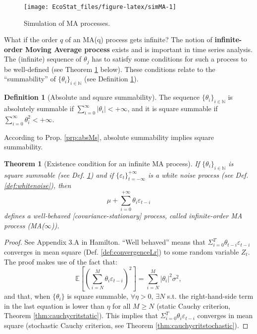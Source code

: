 \documentclass[
  12pt,
]{book}
\newtheorem{theorem}{Theorem}[chapter]
\theoremstyle{definition}
\newtheorem{definition}{Definition}[chapter]
\theoremstyle{definition}
\theoremstyle{definition}
\theoremstyle{definition}
\theoremstyle{remark}
\begin{document}
\begin{figure}
\texttt{[image: EcoStat\_files/figure-latex/simMA-1]} \caption{Simulation of MA processes.}\label{fig:simMA}
\end{figure}

What if the order \(q\) of an MA(q) process gets infinite? The notion of \textbf{infinite-order Moving Average process} exists and is important in time series analysis. The (infinite) sequence of \(\theta_j\) has to satisfy some conditions for such a process to be well-defined (see Theorem \ref{thm:infMA} below). These conditions relate to the ``summability'' of \(\{\theta_{i}\}_{i\in\mathbb{N}}\) (see Definition \ref{def:summability}).

\begin{definition}[Absolute and square summability]
\protect\hypertarget{def:summability}{}\label{def:summability}The sequence \(\{\theta_{i}\}_{i\in\mathbb{N}}\) is absolutely summable if \(\sum_{i=0}^{\infty}|\theta_i| < + \infty\), and it is square summable if \(\sum_{i=0}^{\infty} \theta_i^2 < + \infty\).
\end{definition}

According to Prop. \ref{prp:absMs}, absolute summability implies square summability.

\begin{theorem}[Existence condition for an infinite MA process]
\protect\hypertarget{thm:infMA}{}\label{thm:infMA}If \(\{\theta_{i}\}_{i\in\mathbb{N}}\) is square summable (see Def. \ref{def:summability}) and if \(\{\varepsilon_t\}_{t = -\infty}^{+\infty}\) is a white noise process (see Def. \ref{def:whitenoise}), then
\[
\mu + \sum_{i=0}^{+\infty} \theta_{i} \varepsilon_{t-i}
\]
defines a well-behaved {[}covariance-stationary{]} process, called infinite-order MA process (MA(\(\infty\))).
\end{theorem}

\begin{proof}
See Appendix 3.A in Hamilton. ``Well behaved'' means that \(\Sigma_{i=0}^{T} \theta_{t-i} \varepsilon_{t-i}\) converges in mean square (Def. \ref{def:convergenceLr}) to some random variable \(Z_t\). The proof makes use of the fact that:
\[
\mathbb{E}\left[\left(\sum_{i=N}^{M}\theta_{i} \varepsilon_{t-i}\right)^2\right] = \sum_{i=N}^{M}|\theta_{i}|^2 \sigma^2,
\]
and that, when \(\{\theta_{i}\}\) is square summable, \(\forall \eta>0\), \(\exists N\) s.t. the right-hand-side term in the last equation is lower than \(\eta\) for all \(M \ge N\) (static Cauchy criterion, Theorem \ref{thm:cauchycritstatic}). This implies that \(\Sigma_{i=0}^{T} \theta_{i} \varepsilon_{t-i}\) converges in mean square (stochastic Cauchy criterion, see Theorem \ref{thm:cauchycritstochastic}).
\end{proof}
\end{document}
